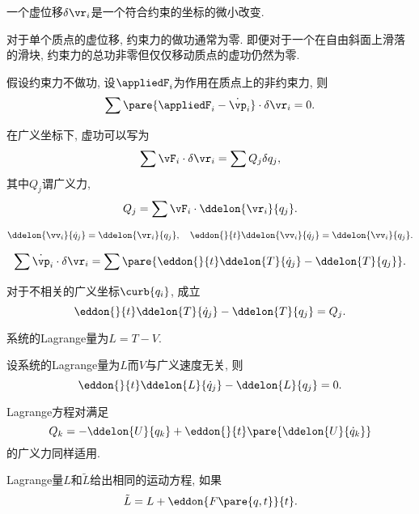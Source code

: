 \documentclass[../TheoreticalMechanics.tex]{subfiles}
\begin{document}
\begin{definition}[虚位移]
	一个虚位移$\delta\vr_i$是一个符合约束的坐标的微小改变.
\end{definition}
\begin{ex}
	对于单个质点的虚位移, 约束力的做功通常为零. 即便对于一个在自由斜面上滑落的滑块, 约束力的总功非零但仅仅移动质点的虚功仍然为零.
\end{ex}
\begin{corollary}[D'Alembert原理]
	假设约束力不做功, 设$\appliedF_i$为作用在质点上的非约束力, 则
	\[ \sum \pare{\appliedF_i - \dot{\vp}_i}\cdot\delta\vr_i = 0. \]
\end{corollary}
\begin{corollary}[广义力]
	在广义坐标下, 虚功可以写为
	\[ \sum \vF_i\cdot\delta\vr_i = \sum Q_j \delta q_j, \]
	其中$Q_j$谓广义力,
	\begin{equation}
	    \label{eq:广义力的定义}
    	Q_j = \sum \vF_i\cdot\ddelon{\vr_i}{q_j}. 
	\end{equation}
\end{corollary}
\begin{lemma}[广义速度对速度与广义坐标对坐标成比例]\quad
	\[ \ddelon{\vv_i}{\dot{q}_j} = \ddelon{\vr_i}{q_j},\quad \eddon{}{t}\ddelon{\vv_i}{\dot{q}_j} = \ddelon{\vv_i}{q_j}. \]
\end{lemma}
\begin{corollary}[动能的变分]\quad
	\[ \sum \dot{\vp}_i\cdot\delta\vr_i = \sum \pare{\eddon{}{t}\ddelon{T}{\dot{q}_j} - \ddelon{T}{q_j}}. \]
\end{corollary}
\begin{finale}
	\begin{corollary}[D'Alembert原理]
		对于不相关的广义坐标$\curb{q_i}$, 成立
		\[ \eddon{}{t}\ddelon{T}{\dot{q}_j} - \ddelon{T}{q_j} = Q_j. \]
	\end{corollary}
\end{finale}
\begin{definition}[Lagrange量]
	系统的Lagrange量为$L=T-V$.
\end{definition}
\begin{finale}
	\begin{corollary}[Lagrange方程]
		设系统的Lagrange量为$L$而$V$与广义速度无关, 则
		\begin{equation}
			\label{eq:Lagrange方程}
			\eddon{}{t}\ddelon{L}{\dot{q}_j} - \ddelon{L}{q_j} = 0.
		\end{equation}
	\end{corollary}
\end{finale}
\begin{corollary}[速度相关势]
	\label{coll:Lagrange方程适用于速度相关势}
	Lagrange方程对满足
	\[ Q_k = -\ddelon{U}{q_k} + \eddon{}{t}\pare{\ddelon{U}{\dot{q}_k}} \]
	的广义力同样适用.
\end{corollary}
\begin{corollary}[Lagrange量的规范不变性]
	Lagrange量$L$和$\tilde{L}$给出相同的运动方程, 如果
	\[ \tilde{L} = L + \eddon{F\pare{q,t}}{t}. \]
\end{corollary}
	
\end{document}

